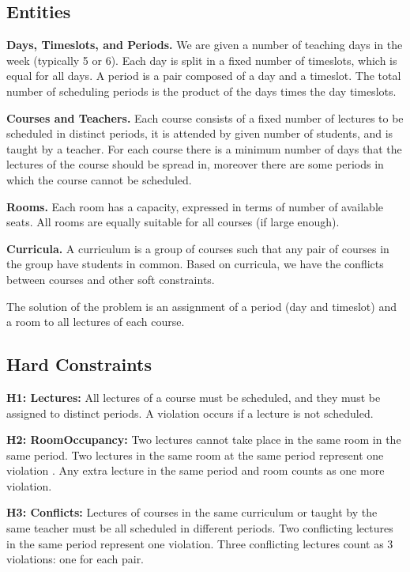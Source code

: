 \documentclass[]{article}
\begin{document}
\subsection{Entities}

\textbf{Days, Timeslots, and Periods.} We are given a number of teaching days in the week (typically 5 or 6). 
Each day is split in a fixed number of timeslots, which is equal for all days.
A period is a pair composed of a day and a timeslot. The total number of 
scheduling periods is the product of the days times the day timeslots.

\textbf{Courses and Teachers.} Each course consists of a fixed number of lectures to be scheduled
in distinct periods, it is attended by given number of students, and is taught by a
teacher. For each course there is a minimum number of days that the lectures of the
course should be spread in, moreover there are some periods in which the course cannot
be scheduled.

\textbf{Rooms.} Each room has a capacity, expressed in terms of number of available seats. All
rooms are equally suitable for all courses (if large enough).

\textbf{Curricula.} A curriculum is a group of courses such that any pair of courses in the group
have students in common. Based on curricula, we have the conflicts between courses
and other soft constraints.

The solution of the problem is an assignment of a period (day and timeslot) and a room
to all lectures of each course.

\subsection{Hard Constraints}

\textbf{H1: Lectures:} All lectures of a course must be scheduled, and they must be assigned to distinct
periods. A violation occurs if a lecture is not scheduled.

\textbf{H2: RoomOccupancy:} Two lectures cannot take place in the same room in the same period.
Two lectures in the same room at the same period represent one violation . Any extra
lecture in the same period and room counts as one more violation.

\textbf{H3: Conflicts:} Lectures of courses in the same curriculum or taught by the same teacher must be
all scheduled in different periods. Two conflicting lectures in the same period represent
one violation. Three conflicting lectures count as 3 violations: one for each pair.
\end{document}

